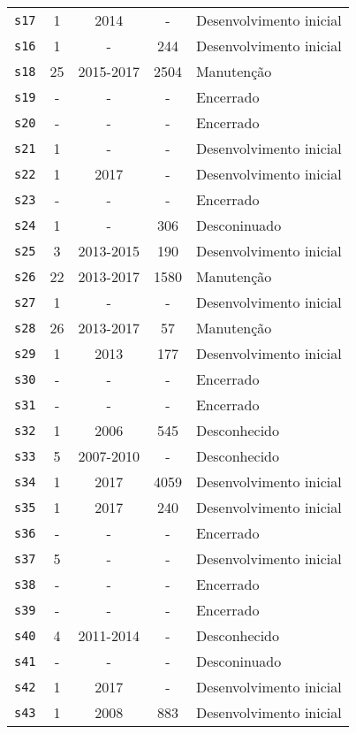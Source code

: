 \begin{longtable}{ l c c c l }
    \texttt{s17} & 1 & 2014 & - & Desenvolvimento inicial \\
    \texttt{s16} & 1 & - & 244 & Desenvolvimento inicial \\
    \texttt{s18} & 25 & 2015-2017 & 2504 & Manutenção \\
    \texttt{s19} & - & - & - & Encerrado \\
    \texttt{s20} & - & - & - & Encerrado \\
    \texttt{s21} & 1 & - & - & Desenvolvimento inicial \\
    \texttt{s22} & 1 & 2017 & - & Desenvolvimento inicial \\
    \texttt{s23} & - & - & - & Encerrado \\
    \texttt{s24} & 1 & - & 306 & Desconinuado \\
    \texttt{s25} & 3 & 2013-2015 & 190 & Desenvolvimento inicial \\
    \texttt{s26} & 22 & 2013-2017 & 1580 & Manutenção \\
    \texttt{s27} & 1 & - & - & Desenvolvimento inicial \\
    \texttt{s28} & 26 & 2013-2017 & 57 & Manutenção \\
    \texttt{s29} & 1 & 2013 & 177 & Desenvolvimento inicial \\
    \texttt{s30} & - & - & - & Encerrado \\
    \texttt{s31} & - & - & - & Encerrado \\
    \texttt{s32} & 1 & 2006 & 545 & Desconhecido \\
    \texttt{s33} & 5 & 2007-2010 & - & Desconhecido \\
    \texttt{s34} & 1 & 2017 & 4059 & Desenvolvimento inicial \\
    \texttt{s35} & 1 & 2017 & 240 & Desenvolvimento inicial \\
    \texttt{s36} & - & - & - & Encerrado \\
    \texttt{s37} & 5 & - & - & Desenvolvimento inicial \\
    \texttt{s38} & - & - & - & Encerrado \\
    \texttt{s39} & - & - & - & Encerrado \\
    \texttt{s40} & 4 & 2011-2014 & - & Desconhecido \\
    \texttt{s41} & - & - & - & Desconinuado \\
    \texttt{s42} & 1 & 2017 & - & Desenvolvimento inicial \\
    \texttt{s43} & 1 & 2008 & 883 & Desenvolvimento inicial \\

\end{longtable}
